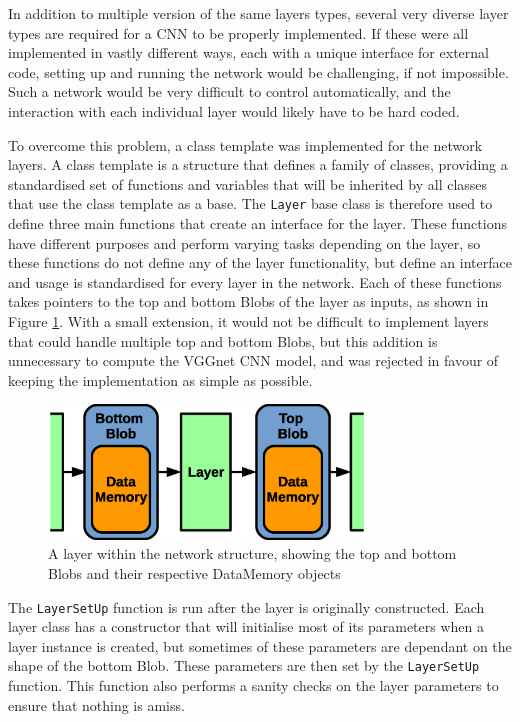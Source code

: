 \documentclass[12pt]{article}
\begin{document}
In addition to multiple version of the same layers types, several very diverse layer types are required for a CNN to be properly implemented. If these were all implemented in vastly different ways, each with a unique interface for external code, setting up and running the network would be challenging, if not impossible. Such a network would be very difficult to control automatically, and the interaction with each individual layer would likely have to be hard coded. 

To overcome this problem, a class template was implemented for the network layers. A class template is a structure that defines a family of classes, providing a standardised set of functions and variables that will be inherited by all classes that use the class template as a base. The \lstinline|Layer| base class is therefore used to define three main functions that create an interface for the layer. These functions have different purposes and perform varying tasks depending on the layer, so these functions do not define any of the layer functionality, but define an interface and usage is standardised for every layer in the network. Each of these functions takes pointers to the top and bottom Blobs of the layer as inputs, as shown in Figure \ref{fig:layer}. With a small extension, it would not be difficult to implement layers that could handle multiple top and bottom Blobs, but this addition is unnecessary to compute the VGGnet CNN model, and was rejected in favour of keeping the implementation as simple as possible.

\begin{figure} [H]
\centering
\includegraphics[width=0.75\textwidth]{figures/layer.eps}
\caption{A layer within the network structure, showing the top and bottom Blobs and their respective DataMemory objects}
\label{fig:layer}
\end{figure}

The \lstinline|LayerSetUp| function is run after the layer is originally constructed. Each layer class has a constructor that will initialise most of its parameters when a layer instance is created, but sometimes of these parameters are dependant on the shape of the bottom Blob. These parameters are then set by the \lstinline|LayerSetUp| function. This function also performs a sanity checks on the layer parameters to ensure that nothing is amiss.
\end{document}
